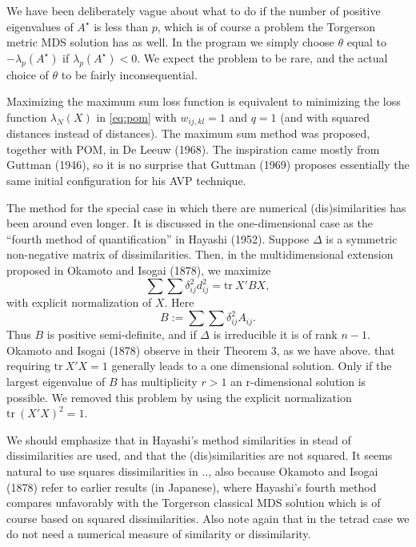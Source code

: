 \documentclass[
  12pt,
]{article}
\begin{document}
We have been deliberately vague about what to do if the number of
positive eigenvalues of \(A^\star\) is less than \(p\), which is of
course a problem the Torgerson metric MDS solution has as well. In the
program we simply choose \(\theta\) equal to \(-\lambda_p(A^\star)\)
if \(\lambda_p(A^\star)<0\). We expect the problem to be rare, and
the actual choice of \(\theta\) to be fairly inconsequential.

Maximizing the maximum sum loss function is equivalent to minimizing
the loss function \(\lambda_N(X)\) in \eqref{eq:pom} with \(w_{ij,kl}=1\)
and \(q=1\) (and with squared distances instead of distances). The
maximum sum method was proposed, together with POM, in De Leeuw (1968).
The inspiration came mostly from Guttman (1946), so it is no surprise that
Guttman (1969) proposes essentially the same initial configuration for his
AVP technique.

The method for the special case in which there are numerical (dis)similarities
has been around even longer. It is discussed
in the one-dimensional case as the ``fourth method of quantification''
in Hayashi (1952). Suppose \(\Delta\) is a symmetric non-negative matrix of
dissimilarities. Then, in the multidimensional extension proposed in
Okamoto and Isogai (1878), we maximize
\begin{equation}
\sum\sum\delta_{ij}^2d_{ij}^2=\text{tr}\ X'BX,
\label{eq:hayashi}
\end{equation}
with explicit normalization of \(X\). Here
\begin{equation}
B:=\sum\sum\delta_{ij}^2 A_{ij}.
\label{eq:bmatdef}
\end{equation}
Thus \(B\) is positive semi-definite, and if \(\Delta\) is irreducible it is
of rank \(n-1\). Okamoto and Isogai (1878) observe in their
Theorem 3, as we have above. that
requiring \(\text{tr}\ X'X=1\) generally leads to a one dimensional solution.
Only if the largest eigenvalue of \(B\) has multiplicity \(r>1\) an r-dimensional
solution is possible. We removed this problem by using the explicit normalization
\(\text{tr}\ (X'X)^2=1\).

We should emphasize that in Hayashi's method similarities
in stead of dissimilarities are used, and that the (dis)similarities are
not squared. It seems natural to use squares dissimilarities in .., also because
Okamoto and Isogai (1878) refer to earlier results (in Japanese), where Hayashi's fourth method compares unfavorably with the Torgerson classical MDS solution which is of course based on squared dissimilarities. Also note again that in the tetrad case we
do not need a numerical measure of similarity or dissimilarity.
\end{document}

